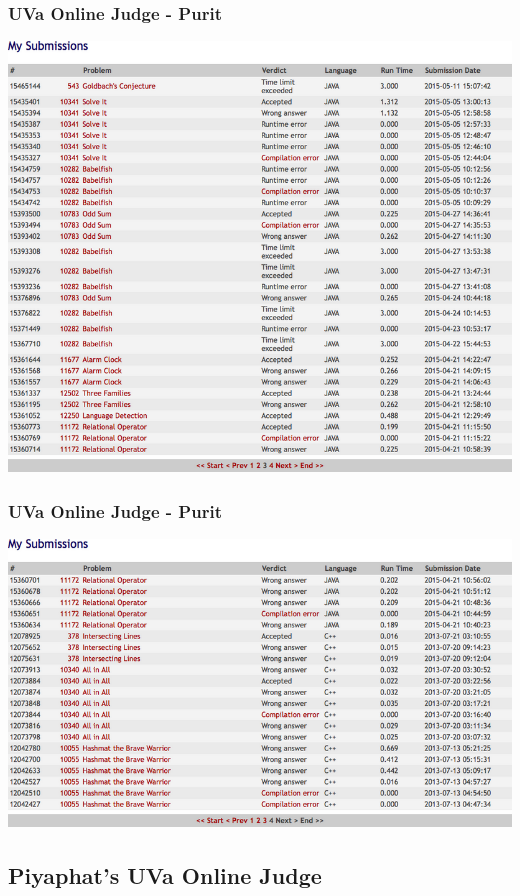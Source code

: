 \documentclass{beamer}
\begin{document}
			\begin{frame}
				\frametitle{UVa Online Judge - Purit}
				\begin{center}
					\includegraphics[scale=0.30]{Submission3-3} 
				\end{center}
			\end{frame}

			\begin{frame}
				\frametitle{UVa Online Judge - Purit}
				\begin{center}
					\includegraphics[scale=0.4]{Submission3-4} 
				\end{center}
			\end{frame}

		\subsection{Piyaphat's UVa Online Judge}
			\begin{frame}
				\subsectionpage
			\end{frame}
\end{document}

